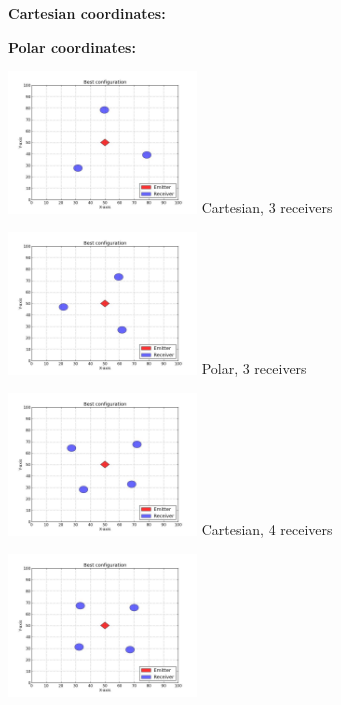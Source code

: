 \documentclass[10pt,a4paper]{book}
\begin{document}
\begin{figure}[H]
\centering
\begin{minipage}{50mm}
\textbf{Cartesian coordinates:}
\end{minipage}%
\begin{minipage}{50mm}
\textbf{Polar coordinates:}
\end{minipage}
\begin{minipage}{50mm}
  \centering
  \includegraphics[width=50mm]{ConfigurationCart3Recv.jpg}
  Cartesian, 3 receivers
\end{minipage}%
\begin{minipage}{50mm}
  \centering
  \includegraphics[width=50mm]{ConfigurationPolar3Recv.jpg}
  Polar, 3 receivers
\end{minipage}
\begin{minipage}{50mm}
  \centering
  \includegraphics[width=50mm]{ConfigurationCart4Recv.jpg}
  Cartesian, 4 receivers
\end{minipage}
\begin{minipage}{50mm}
  \centering
  \includegraphics[width=50mm]{ConfigurationPolar4Recv.jpg}

\end{minipage}
\end{figure}
\end{document}

